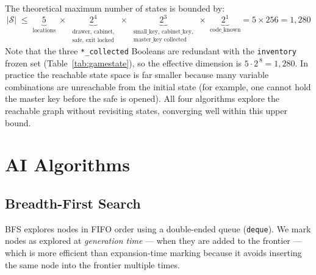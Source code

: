\documentclass[12pt, a4paper]{report}
\begin{document}
The theoretical maximum number of states is bounded by:
\[
  |\mathcal{S}|
  \;\leq\;
  \underbrace{5}_{\text{locations}}
  \;\times\;
  \underbrace{2^4}_{\substack{\text{drawer, cabinet,}\\\text{safe, exit locked}}}
  \;\times\;
  \underbrace{2^3}_{\substack{\text{small\_key, cabinet\_key,}\\\text{master\_key collected}}}
  \;\times\;
  \underbrace{2^1}_{\text{code\_known}}
  = 5 \times 256
  = 1{,}280
\]
Note that the three \texttt{*\_collected} Booleans are redundant with the \texttt{inventory} frozen set (Table~\ref{tab:gamestate}), so the effective dimension is $5 \cdot 2^{\,8} = 1{,}280$.  In practice the reachable state space is far smaller because many variable
combinations are unreachable from the initial state (for example, one cannot
hold the master key before the safe is opened).  All four algorithms explore
the reachable graph without revisiting states, converging well within this
upper bound.

\chapter{AI Algorithms}
\label{chap:algorithms}

\section{Breadth-First Search}
\label{sec:bfs}

BFS explores nodes in FIFO order using a double-ended queue (\texttt{deque}).
We mark nodes as explored at \emph{generation time} --- when they are added to
the frontier --- which is more efficient than expansion-time marking because it
avoids inserting the same node into the frontier multiple times.
\end{document}
